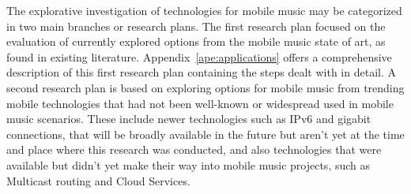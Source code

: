 The explorative investigation of technologies for mobile music may be categorized in two main branches or research plans.
The first research plan focused on the evaluation of currently explored options from the mobile music state of art, as found in existing literature.
Appendix~\ref{ape:applications} offers a comprehensive description of this first research plan containing the steps dealt with in detail.
A second research plan is based on exploring options for mobile music from trending mobile technologies that had not been well-known or widespread used in mobile music scenarios. 
These include newer technologies such as IPv6 and gigabit connections, that will be broadly available in the future but aren't yet at the time and place where this research was conducted, and also technologies that were available but didn't yet make their way into mobile music projects, such as Multicast routing and Cloud Services.








